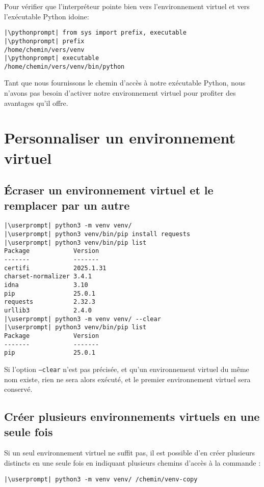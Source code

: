 Pour vérifier que l'interpréteur pointe bien vers l'environnement virtuel  et vers l'exécutable Python idoine:
\begin{lstlisting}[style=repl]
|\pythonprompt| from sys import prefix, executable
|\pythonprompt| prefix
/home/chemin/vers/venv
|\pythonprompt| executable
/home/chemin/vers/venv/bin/python
\end{lstlisting}

Tant que nous fournissons le chemin d'accès à notre exécutable Python, nous n'avons pas besoin d'activer notre environnement virtuel pour profiter des avantages qu'il offre.

\section{Personnaliser un environnement virtuel}
\subsection*{Écraser un environnement virtuel et le remplacer par un autre}
\begin{lstlisting}[style=bash]
|\userprompt| python3 -m venv venv/
|\userprompt| python3 venv/bin/pip install requests
|\userprompt| python3 venv/bin/pip list
Package            Version
-------            -------
certifi            2025.1.31
charset-normalizer 3.4.1
idna               3.10
pip                25.0.1
requests           2.32.3
urllib3            2.4.0
|\userprompt| python3 -m venv venv/ --clear
|\userprompt| python3 venv/bin/pip list
Package            Version
-------            -------
pip                25.0.1
\end{lstlisting}

Si l'option \texttt{--clear} n'est pas précisée, et qu'un environnement virtuel du même nom existe, rien ne sera alors exécuté, et le premier environnement virtuel sera conservé.

\subsection*{Créer plusieurs environnements virtuels en une seule fois}
Si un seul environnement virtuel ne suffit pas, il est possible d'en créer plusieurs distincts en une seule fois en indiquant plusieurs chemins d'accès à la commande :
\begin{lstlisting}[style=bash]
|\userprompt| python3 -m venv venv/ /chemin/venv-copy
\end{lstlisting}

